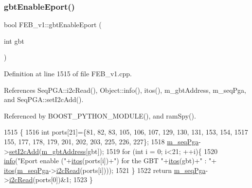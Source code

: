 \subsubsection{\texorpdfstring{gbt\+Enable\+Eport()}{gbtEnableEport()}}
{\footnotesize\ttfamily bool F\+E\+B\+\_\+v1\+::gbt\+Enable\+Eport (\begin{DoxyParamCaption}\item[{int}]{gbt }\end{DoxyParamCaption})}



Definition at line 1515 of file F\+E\+B\+\_\+v1.\+cpp.



References Seq\+P\+G\+A\+::i2c\+Read(), Object\+::info(), itos(), m\+\_\+gbt\+Address, m\+\_\+seq\+Pga, and Seq\+P\+G\+A\+::set\+I2c\+Add().



Referenced by B\+O\+O\+S\+T\+\_\+\+P\+Y\+T\+H\+O\+N\+\_\+\+M\+O\+D\+U\+L\+E(), and ram\+Spy().


\begin{DoxyCode}
1515                                     \{
1516   \textcolor{keywordtype}{int} ports[21]=\{81, 82, 83, 105, 106, 107, 129, 130, 131, 153, 154,
1517          155, 177, 178, 179, 201, 202, 203, 225, 226, 227\};
1518   \hyperlink{classFEB__v1_a6c7804ac86796f233a8393043adf2e77}{m\_seqPga}->\hyperlink{classSeqPGA_a4ef334e4d2cb417b49033dce951728cd}{setI2cAdd}(\hyperlink{classFEB__v1_ac625855df976f16694178f1a4c0eef1e}{m\_gbtAddress}[gbt]);
1519   \textcolor{keywordflow}{for} (\textcolor{keywordtype}{int} i = 0; i<21; ++i)\{
1520     \hyperlink{classObject_a644fd329ea4cb85f54fa6846484b84a8}{info}(\textcolor{stringliteral}{"Eport enable ("}+\hyperlink{Tools_8h_af330027dbdafb9a30768b3613c553e60}{itos}(ports[i])+\textcolor{stringliteral}{") for the GBT "}+\hyperlink{Tools_8h_af330027dbdafb9a30768b3613c553e60}{itos}(gbt)+\textcolor{stringliteral}{" : "}+
      \hyperlink{Tools_8h_af330027dbdafb9a30768b3613c553e60}{itos}(\hyperlink{classFEB__v1_a6c7804ac86796f233a8393043adf2e77}{m\_seqPga}->\hyperlink{classSeqPGA_a7cd344df2be99f3a02b487f80e87b27e}{i2cRead}(ports[i])));
1521   \}
1522   \textcolor{keywordflow}{return} \hyperlink{classFEB__v1_a6c7804ac86796f233a8393043adf2e77}{m\_seqPga}->\hyperlink{classSeqPGA_a7cd344df2be99f3a02b487f80e87b27e}{i2cRead}(ports[0])&1;
1523 \}
\end{DoxyCode}
\mbox{\label{classFEB__v1_aab7166214ef0f99f4835ce9a7416e052}} 
